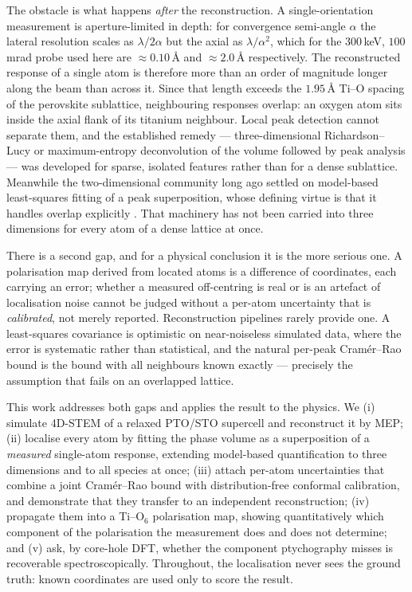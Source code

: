 \documentclass[aps,prb,twocolumn,superscriptaddress,floatfix,nofootinbib]{revtex4-2}
\begin{document}
The obstacle is what happens \emph{after} the reconstruction. A single-orientation measurement
is aperture-limited in depth: for convergence semi-angle $\alpha$ the lateral resolution scales
as $\lambda/2\alpha$ but the axial as $\lambda/\alpha^2$, which for the $300$\,keV,
$100$\,mrad probe used here are $\approx0.10$\,\AA{} and $\approx2.0$\,\AA{} respectively. The
reconstructed response of a single atom is therefore more than an order of magnitude longer
along the beam than across it. Since that length exceeds the $1.95$\,\AA{} Ti--O spacing of the perovskite
sublattice, neighbouring responses overlap: an oxygen atom sits inside the axial flank of its
titanium neighbour. Local peak detection cannot separate them, and the established remedy ---
three-dimensional Richardson--Lucy or maximum-entropy deconvolution of the volume followed by
peak analysis \citep{Ishizuka2021} --- was developed for sparse, isolated features rather than
for a dense sublattice. Meanwhile the two-dimensional community long ago settled on
model-based least-squares fitting of a peak superposition, whose defining virtue is that it
handles overlap explicitly \citep{DeBacker2016}. That machinery has not been carried into three
dimensions for every atom of a dense lattice at once.

There is a second gap, and for a physical conclusion it is the more serious one. A polarisation
map derived from located atoms is a difference of coordinates, each carrying an error; whether
a measured off-centring is real or is an artefact of localisation noise cannot be judged without
a per-atom uncertainty that is \emph{calibrated}, not merely reported. Reconstruction pipelines
rarely provide one. A least-squares covariance is optimistic on near-noiseless simulated data,
where the error is systematic rather than statistical, and the natural per-peak Cram\'er--Rao
bound is the bound with all neighbours known exactly --- precisely the assumption that fails on
an overlapped lattice.

This work addresses both gaps and applies the result to the physics. We (i) simulate 4D-STEM of
a relaxed PTO/STO supercell and reconstruct it by MEP; (ii) localise every atom by fitting the
phase volume as a superposition of a \emph{measured} single-atom response, extending
model-based quantification \citep{DeBacker2016} to three dimensions and to all species at once;
(iii) attach per-atom uncertainties that combine a joint Cram\'er--Rao bound with
distribution-free conformal calibration, and demonstrate that they transfer to an independent
reconstruction; (iv) propagate them into a Ti--O$_6$ polarisation map, showing quantitatively
which component of the polarisation the measurement does and does not determine; and (v) ask,
by core-hole DFT, whether the component ptychography misses is recoverable spectroscopically.
Throughout, the localisation never sees the ground truth: known coordinates are used only to
score the result.
\end{document}
